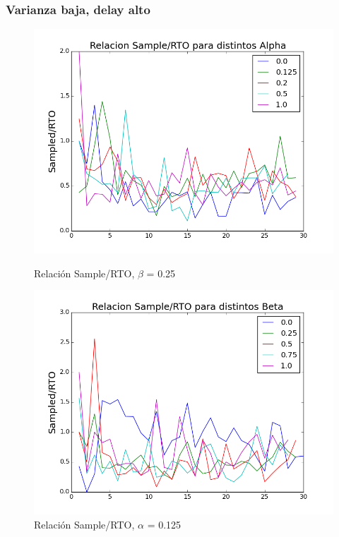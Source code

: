 \subsubsection{Varianza baja, delay alto}

\begin{figure}[H]
\begin{minipage}{0.5\linewidth}
\includegraphics[width=\linewidth]{../graficos/alphad025var2drop50.png}
\caption{Relación Sample/RTO, $\beta$ = 0.25}\label{fig:alpha-var2-drop50-alto}
\end{minipage}
\hfill
\begin{minipage}{0.5\linewidth}
\includegraphics[width=\linewidth]{../graficos/betad025var2drop50.png}
\caption{Relación Sample/RTO, $\alpha$ = 0.125}\label{fig:beta-var2-drop50-alto}
\end{minipage}
\end{figure}


